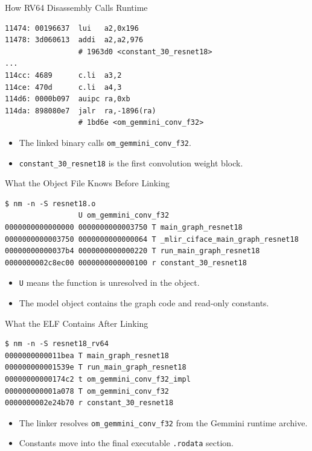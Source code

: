 \documentclass[aspectratio=169,10pt]{beamer}
\newcommand{\code}[1]{\texttt{\footnotesize #1}}
\begin{document}
\begin{frame}[fragile]{How RV64 Disassembly Calls Runtime}
  \begin{lstlisting}
11474: 00196637  lui   a2,0x196
11478: 3d060613  addi  a2,a2,976
                 # 1963d0 <constant_30_resnet18>
...
114cc: 4689      c.li  a3,2
114ce: 470d      c.li  a4,3
114d6: 0000b097  auipc ra,0xb
114da: 898080e7  jalr  ra,-1896(ra)
                 # 1bd6e <om_gemmini_conv_f32>
  \end{lstlisting}
  \begin{itemize}
    \item The linked binary calls \code{om\_gemmini\_conv\_f32}.
    \item \code{constant\_30\_resnet18} is the first convolution weight block.
  \end{itemize}
\end{frame}

\begin{frame}[fragile]{What the Object File Knows Before Linking}
  \begin{lstlisting}
$ nm -n -S resnet18.o
                 U om_gemmini_conv_f32
0000000000000000 0000000000003750 T main_graph_resnet18
0000000000003750 0000000000000064 T _mlir_ciface_main_graph_resnet18
00000000000037b4 0000000000000220 T run_main_graph_resnet18
0000000002c8ec00 0000000000000100 r constant_30_resnet18
  \end{lstlisting}
  \begin{itemize}
    \item \code{U} means the function is unresolved in the object.
    \item The model object contains the graph code and read-only constants.
  \end{itemize}
\end{frame}

\begin{frame}[fragile]{What the ELF Contains After Linking}
  \begin{lstlisting}
$ nm -n -S resnet18_rv64
0000000000011bea T main_graph_resnet18
000000000001539e T run_main_graph_resnet18
00000000000174c2 t om_gemmini_conv_f32_impl
000000000001a078 T om_gemmini_conv_f32
0000000002e24b70 r constant_30_resnet18
  \end{lstlisting}
  \begin{itemize}
    \item The linker resolves \code{om\_gemmini\_conv\_f32} from the Gemmini runtime archive.
    \item Constants move into the final executable \code{.rodata} section.
  \end{itemize}
\end{frame}
\end{document}
